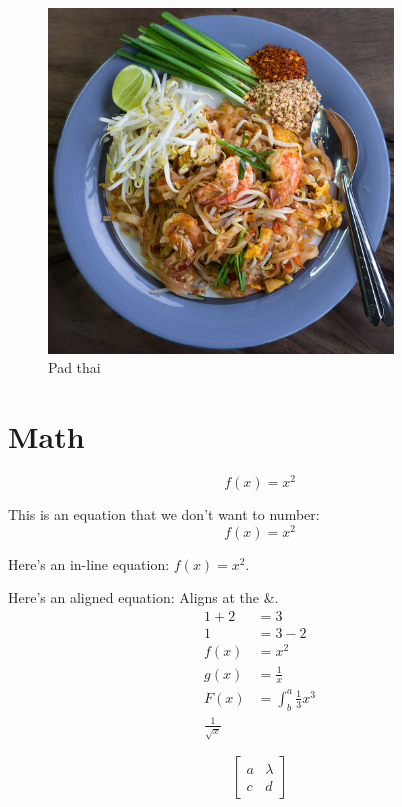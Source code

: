 \documentclass[12pt,letterpaper,titlepage]{report}
\begin{document}
\begin{figure}[H]   %
	\centering
	\includegraphics[width=3.6in]{images/padthai.jpg}
	\caption{Pad thai}
	\label{fig:padthai}
\end{figure}



\section{Math}

\begin{equation}
	f(x) = x^2
\end{equation}


This is an equation that we don't want to number: $$f(x) = x^2$$

Here's an in-line equation: $f(x) = x^2$.

Here's an aligned equation: Aligns at the \&.
\begin{align*}
	1 + 2 & = 3                       \\
	1     & = 3 - 2                   \\
	f(x)  & = x^2                     \\
	g(x)  & = \frac{1}{x}             \\
	F(x)  & = \int^a_b \frac{1}{3}x^3 \\
	\frac{1}{\sqrt{x}}
\end{align*}

\[\begin{bmatrix}
		a & \lambda \\
		c & d
	\end{bmatrix}\]
\end{document}
